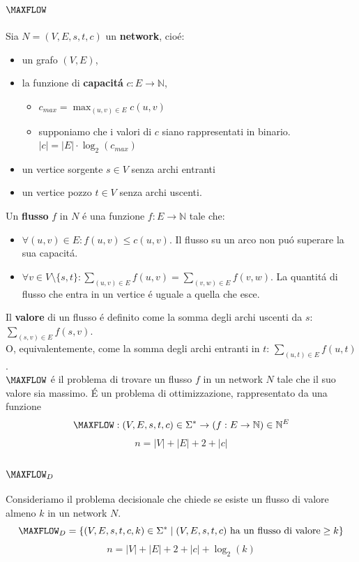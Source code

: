 \subsection{$\MAXFLOW$}
Sia $N = (V, E, s, t, c)$ un \textbf{network}, cioé:
\begin{itemize}
	\item un grafo $(V, E)$, 
	\item la funzione di \textbf{capacitá} $c: E \rightarrow \mathbb{N}$,
	\begin{itemize}
        \item $c_{max} = \max_{(u, v) \in E} c(u, v)$
        \item supponiamo che i valori di $c$ siano rappresentati in binario. \\
        $|c| = |E| \cdot \log_2(c_{max})$
    \end{itemize}
	\item un vertice sorgente $s \in V$ senza archi entranti 
	\item un vertice pozzo $t \in V$ senza archi uscenti.
\end{itemize} 
Un \textbf{flusso} $f$ in $N$ é una funzione $f: E \rightarrow \mathbb{N}$ tale che:
\begin{itemize}
    \item $\forall (u, v) \in E : f(u, v) \leq c(u, v)$. 
        \subitem Il flusso su un arco non puó superare la sua capacitá.
    \item $\forall v \in V \setminus \{s, t\} : \sum_{(u, v) \in E} f(u, v) = \sum_{(v, w) \in E} f(v, w)$. 
        \subitem La quantitá di flusso che entra in un vertice é uguale a quella che esce.
\end{itemize}
Il \textbf{valore} di un flusso é definito come la somma degli archi uscenti da $s$: $\sum_{(s, v) \in E} f(s, v)$. \\
O, equivalentemente, come la somma degli archi entranti in $t$: $\sum_{(u, t) \in E} f(u, t)$. \\

$\MAXFLOW$ é il problema di trovare un flusso $f$ in un network $N$ tale che il suo valore sia massimo.
É un problema di ottimizzazione, rappresentato da una funzione 
\[
\MAXFLOW: (V, E, s, t, c) \in \Sigma^* \rightarrow (f: E \rightarrow \mathbb{N}) \in \mathbb{N}^E
\]
\[
n = |V| + |E| + 2 + |c|
\]

\subsubsection{$\MAXFLOW_D$}
Consideriamo il problema decisionale che chiede se esiste un flusso di valore almeno $k$ in un network $N$.
\[
\MAXFLOW_D = \{ (V, E, s, t, c, k) \in \Sigma^* \mid (V, E, s, t, c) \text{ ha un flusso di valore} \geq k \}
\]
\[
n = |V| + |E| + 2 + |c| + \log_2(k)
\]

